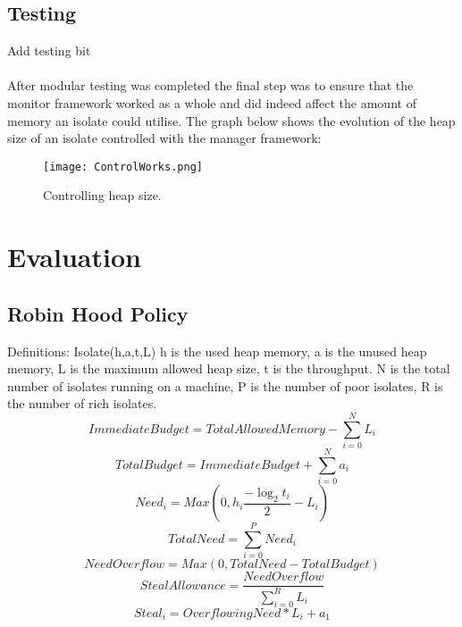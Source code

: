 \documentclass{l4proj}
\begin{document}
\section{Testing}
Add testing bit
\\\\
\hspace*{3em} After modular testing was completed the final step was to ensure that the monitor framework worked as a whole and did indeed affect the amount of memory an isolate could utilise. The graph below shows the evolution of the heap size of an isolate controlled with the manager framework:
\begin{figure}[!ht]
  \centering
    \texttt{[image: ControlWorks.png]}
	\caption{Controlling heap size.}
\end{figure}

\chapter{Evaluation}
\section{Robin Hood Policy}
Definitions: Isolate(h,a,t,L) h is the used heap memory, a is the unused heap memory, L is the maximum allowed heap size, t is the throughput. N is the total number of isolates running on a machine, P is the number of poor isolates, R is the number of rich isolates. 
\begin{displaymath}
Immediate Budget = Total Allowed Memory - \sum_{i=0}^{N}L_i
\end{displaymath}
\begin{displaymath}
Total Budget     = Immediate Budget + \sum_{i=0}^{N}a_i
\end{displaymath}
\begin{displaymath}
Need_i     = Max(0,h_i \frac{-\log_2{t_i}}{2} - L_i)
\end{displaymath}
\begin{displaymath}
Total Need = \sum_{i=0}^{P}Need_i
\end{displaymath}
\begin{displaymath}
NeedOverflow     = Max(0,TotalNeed - TotalBudget) 
\end{displaymath}
\begin{displaymath}
StealAllowance = \frac{NeedOverflow}{\sum_{i=0}^{R}L_i} 
\end{displaymath}
\begin{displaymath}
Steal_i = OverflowingNeed*L_i+a_1 
\end{displaymath}
\end{document}
